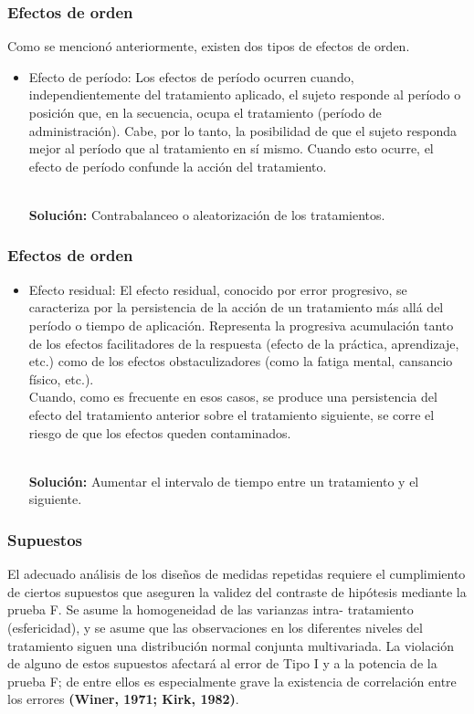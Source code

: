 \documentclass[12pt]{beamer}
\begin{document}
\begin{frame}
\frametitle{Efectos de orden}
Como se mencionó anteriormente, existen dos tipos de efectos de orden.
\begin{itemize}
\justifying
\item Efecto de período: Los efectos de período ocurren cuando, independientemente del tratamiento aplicado, el sujeto responde al período o posición que, en la secuencia, ocupa el tratamiento (período de administración). Cabe, por lo tanto, la posibilidad de que el sujeto responda mejor al período que al tratamiento en sí mismo. Cuando esto ocurre, el efecto de período confunde la acción del tratamiento.

~\\\textbf{Solución:} Contrabalanceo o aleatorización de los tratamientos.
\end{itemize}
\end{frame}

\begin{frame}
\frametitle{Efectos de orden}
\begin{itemize}
\justifying
\item Efecto residual: El efecto residual, conocido por error progresivo, se caracteriza por la persistencia de la acción de un tratamiento más allá del período o tiempo de aplicación. Representa la progresiva acumulación tanto de los efectos facilitadores de la respuesta (efecto de la práctica, aprendizaje, etc.) como de los efectos obstaculizadores (como la fatiga mental, cansancio físico, etc.).
~\\Cuando, como es frecuente en esos casos, se produce una persistencia del efecto del tratamiento anterior sobre el tratamiento siguiente, se corre el riesgo de que los efectos queden contaminados.

~\\\textbf{Solución:} Aumentar el intervalo de tiempo entre un tratamiento y el siguiente.                                  
\end{itemize}
\end{frame}

\begin{frame}
\frametitle{Supuestos}
El adecuado análisis de los diseños de medidas repetidas requiere el cumplimiento de ciertos
supuestos que aseguren la validez del contraste de hipótesis mediante la prueba F. Se asume la
homogeneidad de las varianzas intra- tratamiento (esfericidad), y se asume que las observaciones
en los diferentes niveles del tratamiento siguen una distribución normal conjunta multivariada. La
violación de alguno de estos supuestos afectará al error de Tipo I y a la potencia de la prueba F; de
entre ellos es especialmente grave la existencia de correlación entre los errores \textbf{(Winer, 1971;
Kirk, 1982)}.
\end{frame}
\end{document}
